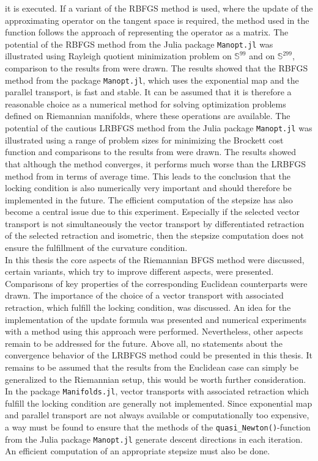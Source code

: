 it is executed. If a variant of the RBFGS method is used, where the update of the approximating operator on the tangent space is required, the method used in the function follows the approach of representing the operator as a matrix. The potential of the RBFGS method from the Julia package \lstinline!Manopt.jl! was illustrated using Rayleigh quotient minimization problem on $\mathbb{S}^{99}$ and on $\mathbb{S}^{299}$, comparison to the results from \cite{Qi:2011} were drawn. The results showed that the RBFGS method from the package \lstinline!Manopt.jl!, which uses the exponential map and the parallel transport, is fast and stable. It can be assumed that it is therefore a reasonable choice as a numerical method for solving optimization problems defined on Riemannian manifolds, where these operations are available. The potential of the cautious LRBFGS method from the Julia package \lstinline!Manopt.jl! was illustrated using a range of problem sizes for minimizing the Brockett cost function and comparisons to the results from \cite{HuangGallivanAbsil:2015} were drawn. The results showed that although the method converges, it performs much worse than the LRBFGS method from \cite{HuangGallivanAbsil:2015} in terms of average time. This leads to the conclusion that the locking condition is also numerically very important and should therefore be implemented in the future. The efficient computation of the stepsize has also become a central issue due to this experiment. Especially if the selected vector transport is not simultaneously the vector transport by differentiated retraction of the selected retraction and isometric, then the stepsize computation does not ensure the fulfillment of the curvature condition.\\
In this thesis the core aspects of the Riemannian BFGS method were discussed, certain variants, which try to improve different aspects, were presented. Comparisons of key properties of the corresponding Euclidean counterparts were drawn. The importance of the choice of a vector transport with associated retraction, which fulfill the locking condition, was discussed. An idea for the implementation of the update formula was presented and numerical experiments with a method using this approach were performed. Nevertheless, other aspects remain to be addressed for the future. Above all, no statements about the convergence behavior of the LRBFGS method could be presented in this thesis. It remains to be assumed that the results from the Euclidean case can simply be generalized to the Riemannian setup, this would be worth further consideration. In the package \lstinline!Manifolds.jl!, vector transports with associated retraction which fulfill the locking condition are generally not implemented. Since exponential map and parallel transport are not always available or computationally too expensive, a way must be found to ensure that the methods of the \lstinline!quasi_Newton()!-function from the Julia package \lstinline!Manopt.jl! generate descent directions in each iteration. An efficient computation of an appropriate stepsize must also be done.


